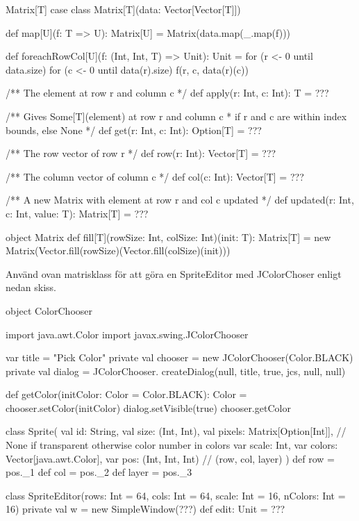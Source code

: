 \begin{ScalaSpec}{Matrix[T]}
case class Matrix[T](data: Vector[Vector[T]]){

  def map[U](f: T => U): Matrix[U] = Matrix(data.map(_.map(f)))

  def foreachRowCol[U](f: (Int, Int, T) => Unit): Unit = 
    for (r <- 0 until data.size) {
      for (c <- 0 until data(r).size) {
        f(r, c, data(r)(c))
      }
    }

  /** The element at row r and column c */
  def apply(r: Int, c: Int): T = ???

  /** Gives Some[T](element) at row r and column c 
   *  if r and c are within index bounds, else None */
  def get(r: Int, c: Int): Option[T] = ???

  /** The row vector of row r */ 
  def row(r: Int): Vector[T] = ???

  /** The column vector of column c */ 
  def col(c: Int): Vector[T] = ???

  /** A new Matrix with element at row r and col c updated */
  def updated(r: Int, c: Int, value: T): Matrix[T] = ???
}
object Matrix {
  def fill[T](rowSize: Int, colSize: Int)(init: T): Matrix[T] = 
    new Matrix(Vector.fill(rowSize)(Vector.fill(colSize)(init)))  
}
\end{ScalaSpec}

\Subtask Använd ovan matrisklass för att göra en SpriteEditor med JColorChoser enligt nedan skiss.

\begin{Code}
object ColorChooser {
  import java.awt.Color
  import javax.swing.JColorChooser
  
  var title = "Pick Color"
  private val chooser = new JColorChooser(Color.BLACK)
  private val dialog = JColorChooser.
    createDialog(null, title, true, jcs, null, null)
  
  def getColor(initColor: Color = Color.BLACK): Color = {
    chooser.setColor(initColor)
    dialog.setVisible(true)
    chooser.getColor
  }
}

class Sprite(
  val id: String,
  val size: (Int, Int),
  val pixels: Matrix[Option[Int]], // None if transparent otherwise color number in colors
  var scale: Int, 
  var colors: Vector[java.awt.Color], 
  var pos: (Int, Int, Int)  // (row, col, layer)
){
  def row = pos._1
  def col = pos._2
  def layer = pos._3
}

class SpriteEditor(rows: Int = 64, cols: Int = 64, scale: Int = 16, nColors: Int = 16) {
  private val w = new SimpleWindow(???)
  def edit: Unit = ???
}

\end{Code}



